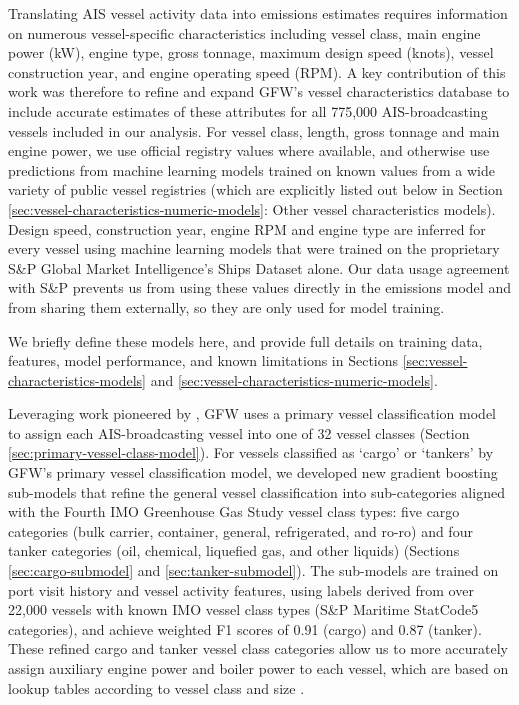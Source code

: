 \documentclass[lineno,pdflatex,sn-nature]{sn-jnl}
\begin{document}
Translating AIS vessel activity data into emissions estimates requires information on numerous vessel-specific characteristics including vessel class, main engine power (kW), engine type, gross tonnage, maximum design speed (knots), vessel construction year, and engine operating speed (RPM). A key contribution of this work was therefore to refine and expand GFW's vessel characteristics database to include accurate estimates of these attributes for all 775,000 AIS-broadcasting vessels included in our analysis. For vessel class, length, gross tonnage and main engine power, we use official registry values where available, and otherwise use predictions from machine learning models trained on known values from a wide variety of public vessel registries (which are explicitly listed out below in Section \ref{sec:vessel-characteristics-numeric-models}: Other vessel characteristics models). Design speed, construction year, engine RPM and engine type are inferred for every vessel using machine learning models that were trained on the proprietary S\&P Global Market Intelligence's Ships Dataset alone. Our data usage agreement with S\&P prevents us from using these values directly in the emissions model and from sharing them externally, so they are only used for model training.


We briefly define these models here, and provide full details on training data, features, model performance, and known limitations in Sections \ref{sec:vessel-characteristics-models} and \ref{sec:vessel-characteristics-numeric-models}.

Leveraging work pioneered by \cite{kroodsma2018tracking}, GFW uses a primary vessel classification model to assign each AIS-broadcasting vessel into one of 32 vessel classes (Section \ref{sec:primary-vessel-class-model}). For vessels classified as `cargo' or `tankers' by GFW's primary vessel classification model, we developed new gradient boosting sub-models that refine the general vessel classification into sub-categories aligned with the Fourth IMO Greenhouse Gas Study vessel class types: five cargo categories (bulk carrier, container, general, refrigerated, and ro-ro) and four tanker categories (oil, chemical, liquefied gas, and other liquids) (Sections \ref{sec:cargo-submodel} and \ref{sec:tanker-submodel}). The sub-models are trained on port visit history and vessel activity features, using labels derived from over 22,000 vessels with known IMO vessel class types (S\&P Maritime StatCode5 categories), and achieve weighted F1 scores of 0.91 (cargo) and 0.87 (tanker). These refined cargo and tanker vessel class categories allow us to more accurately assign auxiliary engine power and boiler power to each vessel, which are based on lookup tables according to vessel class and size \cite{fourth2020greenhouse}. 
\end{document}
